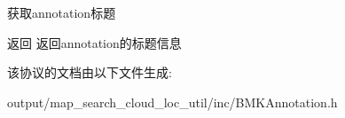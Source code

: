 获取annotation标题 \begin{DoxyReturn}{返回}
返回annotation的标题信息 
\end{DoxyReturn}


该协议的文档由以下文件生成\+:\begin{DoxyCompactItemize}
\item 
output/map\+\_\+search\+\_\+cloud\+\_\+loc\+\_\+util/inc/B\+M\+K\+Annotation.\+h\end{DoxyCompactItemize}
